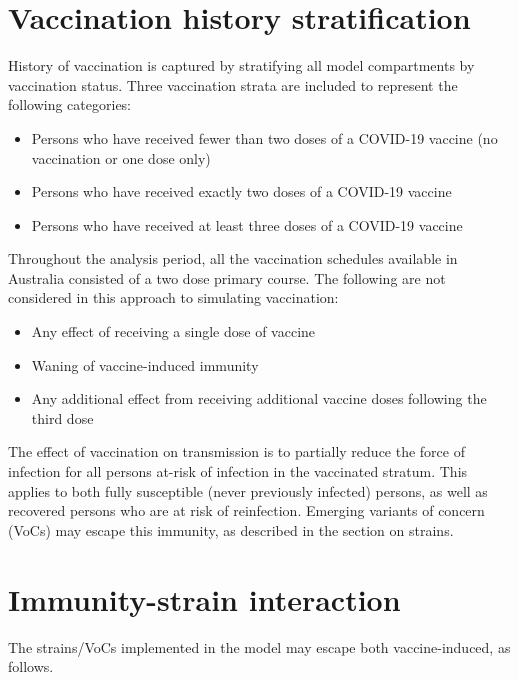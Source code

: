 \section{Vaccination history stratification}
History of vaccination is captured by stratifying all model compartments by vaccination status.
Three vaccination strata are included to represent the following categories:
\begin{itemize}
    \item Persons who have received fewer than two doses of a COVID-19 vaccine (no vaccination or one dose only)
    \item Persons who have received exactly two doses of a COVID-19 vaccine
    \item Persons who have received at least three doses of a COVID-19 vaccine
\end{itemize}
Throughout the analysis period, all the vaccination schedules available in Australia
consisted of a two dose primary course.
The following are not considered in this approach to simulating vaccination:
\begin{itemize}
    \item Any effect of receiving a single dose of vaccine
    \item Waning of vaccine-induced immunity
    \item Any additional effect from receiving additional vaccine doses following the third dose
\end{itemize}
The effect of vaccination on transmission is to partially reduce 
the force of infection for all persons at-risk of infection in the vaccinated stratum.
This applies to both fully susceptible (never previously infected) persons,
as well as recovered persons who are at risk of reinfection.
Emerging variants of concern (VoCs) may escape this immunity, as described in the section on strains.

\section{Immunity-strain interaction}
The strains/VoCs implemented in the model may escape both vaccine-induced, 
as follows.

